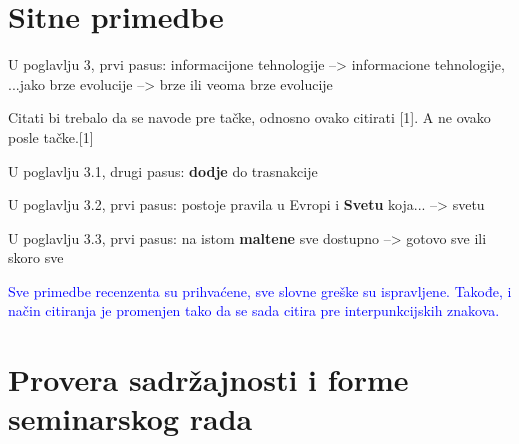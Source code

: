 \documentclass[a4paper]{report}
\newcommand{\odgovor}[1]{\textcolor{blue}{#1}}
\begin{document}
\section{Sitne primedbe}

U poglavlju 3, prvi pasus: informacijone tehnologije --> informacione tehnologije, ...jako brze evolucije --> brze ili veoma brze evolucije

Citati bi trebalo da se navode pre tačke, odnosno ovako citirati [1]. A ne ovako posle tačke.[1] 

U poglavlju 3.1, drugi pasus: \textbf{dodje} do trasnakcije

U poglavlju 3.2, prvi pasus: postoje pravila u Evropi i \textbf{Svetu} koja... --> svetu 

U poglavlju 3.3, prvi pasus: na istom \textbf{maltene} sve dostupno --> gotovo sve ili skoro sve

\odgovor{Sve primedbe recenzenta su prihvaćene, sve slovne greške su ispravljene. Takođe, i način citiranja je promenjen tako da se sada citira pre interpunkcijskih znakova.}

\section{Provera sadržajnosti i forme seminarskog rada}
\end{document}
